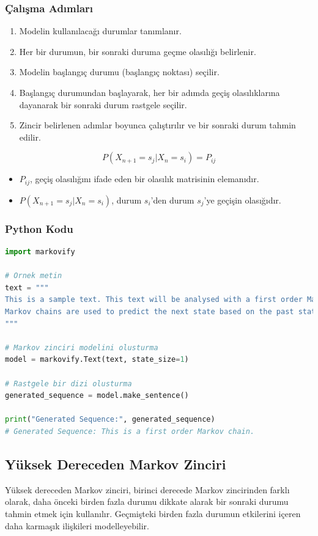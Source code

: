 \subsubsection{Çalışma Adımları}
\begin{enumerate}
    \item Modelin kullanılacağı durumlar tanımlanır.
    \item Her bir durumun, bir sonraki duruma geçme olasılığı belirlenir.
    \item Modelin başlangıç durumu (başlangıç noktası) seçilir.
    \item Başlangıç durumundan başlayarak, her bir adımda geçiş olasılıklarına dayanarak bir sonraki durum rastgele seçilir.
    \item Zincir belirlenen adımlar boyunca çalıştırılır ve bir sonraki durum tahmin edilir.
\end{enumerate}

\[P(X_{n+1} = s_j | X_n = s_i) = P_{ij}\]

\begin{itemize}
    \item $P_{ij}$, geçiş olasılığını ifade eden bir olasılık matrisinin elemanıdır.
    \item $P(X_{n+1} = s_j | X_n = s_i)$, durum  $s_{i}$'den durum $s_{j}$'ye geçişin olasığıdır.
\end{itemize}

\subsubsection{Python Kodu}

\begin{lstlisting}[language=Python]
import markovify

# Ornek metin
text = """
This is a sample text. This text will be analysed with a first order Markov chain. 
Markov chains are used to predict the next state based on the past state.
"""

# Markov zinciri modelini olusturma
model = markovify.Text(text, state_size=1)

# Rastgele bir dizi olusturma
generated_sequence = model.make_sentence()

print("Generated Sequence:", generated_sequence)
# Generated Sequence: This is a first order Markov chain.   
\end{lstlisting}

\subsection{Yüksek Dereceden Markov Zinciri}
Yüksek dereceden Markov zinciri, birinci derecede Markov zincirinden farklı olarak, daha önceki birden fazla durumu dikkate alarak bir sonraki durumu tahmin etmek için kullanılır. Geçmişteki birden fazla durumun etkilerini içeren daha karmaşık ilişkileri modelleyebilir. 

